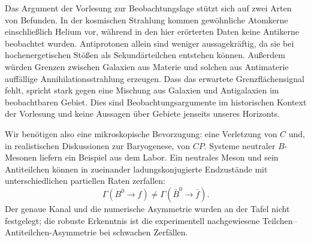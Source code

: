 \begin{classroomqa}\end{classroomqa}

Das Argument der Vorlesung zur Beobachtungslage stützt sich auf zwei Arten von Befunden. In der kosmischen Strahlung kommen gewöhnliche Atomkerne einschließlich Helium vor, während in den hier erörterten Daten keine Antikerne beobachtet wurden. Antiprotonen allein sind weniger aussagekräftig, da sie bei hochenergetischen Stößen als Sekundärteilchen entstehen können. Außerdem würden Grenzen zwischen Galaxien aus Materie und solchen aus Antimaterie auffällige Annihilationsstrahlung erzeugen. Dass das erwartete Grenzflächensignal fehlt, spricht stark gegen eine Mischung aus Galaxien und Antigalaxien im beobachtbaren Gebiet. Dies sind Beobachtungsargumente im historischen Kontext der Vorlesung und keine Aussagen über Gebiete jenseits unseres Horizonts.

\begin{classroomqa}\end{classroomqa}

Wir benötigen also eine mikroskopische Bevorzugung: eine Verletzung von \(C\) und, in realistischen Diskussionen zur Baryogenese, von \(CP\). Systeme neutraler \(B\)-Mesonen liefern ein Beispiel aus dem Labor. Ein neutrales Meson und sein Antiteilchen können in zueinander ladungskonjugierte Endzustände mit unterschiedlichen partiellen Raten zerfallen:
\begin{equation}
\Gamma(B^0\to f)\ne\Gamma(\bar B^0\to\bar f).
\label{eq:c08-cp-partial}
\end{equation}
Der genaue Kanal und die numerische Asymmetrie wurden an der Tafel nicht festgelegt; die robuste Erkenntnis ist die experimentell nachgewiesene Teilchen--Antiteilchen-Asymmetrie bei schwachen Zerfällen.

